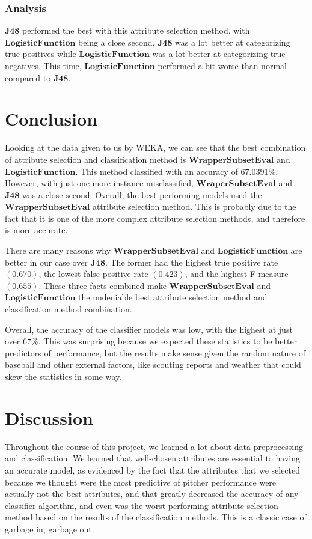 \documentclass[12pt]{article}
\begin{document}
\newpage
\subsubsection{Analysis}
$\textbf{J48}$ performed the best with this attribute selection method, with $\textbf{LogisticFunction}$ being a close second. $\textbf{J48}$ was a lot better at categorizing true positives while $\textbf{LogisticFunction}$ was a lot better at categorizing true negatives. This time, $\textbf{LogisticFunction}$ performed a bit worse than normal compared to $\textbf{J48}$. 

\section{Conclusion}
Looking at the data given to us by WEKA, we can see that the best combination of attribute selection and classification method is $\textbf{WrapperSubsetEval}$ and $\textbf{LogisticFunction}$. This method classified with an accuracy of $67.0391\%$. However, with just one more instance misclassified, $\textbf{WraperSubsetEval}$ and $\textbf{J48}$ was a close second. Overall, the best performing models used the $\textbf{WrapperSubsetEval}$ attribute selection method. This is probably due to the fact that it is one of the more complex attribute selection methods, and therefore is more accurate. 

There are many reasons why $\textbf{WrapperSubsetEval}$ and $\textbf{LogisticFunction}$ are better in our case over $\textbf{J48}$. The former had the highest true positive rate $(0.670)$, the lowest false positive rate $(0.423)$, and the highest F-measure $(0.655)$. These three facts combined make $\textbf{WrapperSubsetEval}$ and $\textbf{LogisticFunction}$ the undeniable best attribute selection method and classification method combination. 

Overall, the accuracy of the classifier models was low, with the highest at just over $67\%$. This was surprising because we expected these statistics to be better predictors of performance, but the results make sense given the random nature of baseball and other external factors, like scouting reports and weather that could skew the statistics in some way. 


\section{Discussion}
Throughout the course of this project, we learned a lot about data preprocessing and classification. We learned that well-chosen attributes are essential to having an accurate model, as evidenced by the fact that the attributes that we selected because we thought were the most predictive of pitcher performance were actually not the best attributes, and that greatly decreased the accuracy of any classifier algorithm, and even was the worst performing attribute selection method based on the results of the classification methods. This is a classic case of garbage in, garbage out. 
\end{document}

